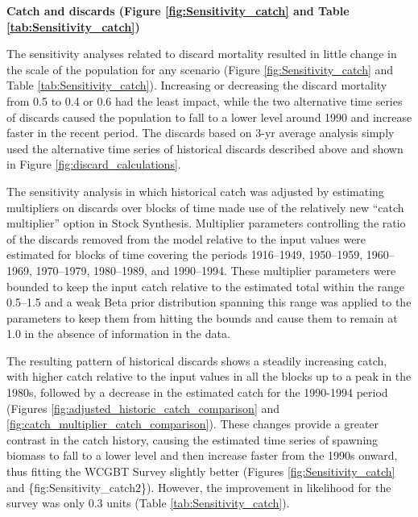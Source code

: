 \documentclass[12pt,]{article}
\begin{document}
\textbf{Catch and discards (Figure \ref{fig:Sensitivity_catch} and Table
\ref{tab:Sensitivity_catch})}

The sensitivity analyses related to discard mortality resulted in little
change in the scale of the population for any scenario (Figure
\ref{fig:Sensitivity_catch} and Table \ref{tab:Sensitivity_catch}).
Increasing or decreasing the discard mortality from 0.5 to 0.4 or 0.6
had the least impact, while the two alternative time series of discards
caused the population to fall to a lower level around 1990 and increase
faster in the recent period. The discards based on 3-yr average analysis
simply used the alternative time series of historical discards described
above and shown in Figure \ref{fig:discard_calculations}.

The sensitivity analysis in which historical catch was adjusted by
estimating multipliers on discards over blocks of time made use of the
relatively new ``catch multiplier'' option in Stock Synthesis.
Multiplier parameters controlling the ratio of the discards removed from
the model relative to the input values were estimated for blocks of time
covering the periods 1916--1949, 1950--1959, 1960--1969, 1970--1979,
1980--1989, and 1990--1994. These multiplier parameters were bounded to
keep the input catch relative to the estimated total within the range
0.5--1.5 and a weak Beta prior distribution spanning this range was
applied to the parameters to keep them from hitting the bounds and cause
them to remain at 1.0 in the absence of information in the data.

The resulting pattern of historical discards shows a steadily increasing
catch, with higher catch relative to the input values in all the blocks
up to a peak in the 1980s, followed by a decrease in the estimated catch
for the 1990-1994 period (Figures
\ref{fig:adjusted_historic_catch_comparison} and
\ref{fig:catch_multiplier_catch_comparison}). These changes provide a
greater contrast in the catch history, causing the estimated time series
of spawning biomass to fall to a lower level and then increase faster
from the 1990s onward, thus fitting the WCGBT Survey slightly better
(Figures \ref{fig:Sensitivity_catch} and \{fig:Sensitivity\_catch2\}).
However, the improvement in likelihood for the survey was only 0.3 units
(Table \ref{tab:Sensitivity_catch}).
\end{document}
